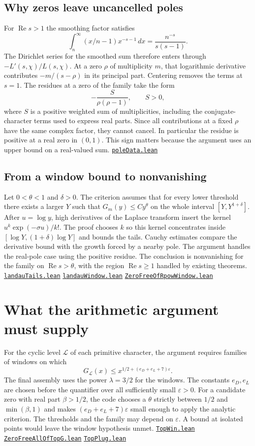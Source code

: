 \documentclass[11pt,a4paper]{article}
\newcommand{\repo}{https://github.com/LiRunGuo/riemann-lean-verification}
\newcommand{\src}[2]{\href{\repo/blob/main/lean/src/#1}{\mbox{\nolinkurl{#2}}}}
\newcommand{\cb}{Development/AutomorphicArithmetic/CharacterBoxes}
\newcommand{\lt}{Development/AutomorphicArithmetic/DedekindLFunctions/LandauTheorems}
\newcommand{\tc}{Development/AutomorphicArithmetic/ThetaCorrespondence/ThetaPairLifts/ThirdPlaceSeries}
\newcommand{\hc}{Formalism/SharpRestriction/RamificationFrobenius/TotientGaloisClasses}
\newcommand{\RePart}{\operatorname{Re}}
\begin{document}
\subsection*{Why zeros leave uncancelled poles}

For $\RePart s>1$ the smoothing factor satisfies
\[
 \int_n^\infty (x/n-1)x^{-s-1}\,dx=\frac{n^{-s}}{s(s-1)}.
\]
The Dirichlet series for the smoothed sum therefore enters through
$-L'(s,\chi)/L(s,\chi)$. At a zero $\rho$ of multiplicity $m$, that logarithmic
derivative contributes $-m/(s-\rho)$ in its principal part. Centering removes
the terms at $s=1$. The residues at a zero of the family take the form
\[
                  -\frac{S}{\rho(\rho-1)},\qquad S>0 ,
\]
where $S$ is a positive weighted sum of multiplicities, including the
conjugate-character terms used to express real parts. Since all contributions
at a fixed $\rho$ have the same complex factor, they cannot cancel. In
particular the residue is positive at a real zero in $(0,1)$. This sign
matters because the argument uses an upper bound on a real-valued sum.
\src{\lt/poleData.lean}{poleData.lean}

\subsection*{From a window bound to nonvanishing}

Let $0<\theta<1$ and $\delta>0$. The criterion assumes that for every lower
threshold there exists a larger $Y$ such that $G_m(y)\le C y^\theta$ on
the whole interval $[Y,Y^{1+\delta}]$. After $u=\log y$, high derivatives of
the Laplace transform insert the kernel $u^k\exp(-\sigma u)/k!$.
The proof chooses $k$ so this kernel concentrates inside
$[\log Y,(1+\delta)\log Y]$ and bounds the tails. Cauchy estimates compare
the derivative bound with the growth forced by a nearby pole. The argument
handles the real-pole case using the positive residue. The conclusion is
nonvanishing for the family on $\RePart s>\theta$, with the region
$\RePart s\ge1$ handled by existing theorems.
\src{\lt/landauTails.lean}{landauTails.lean}
\src{\lt/landauWindow.lean}{landauWindow.lean}
\src{\lt/ZeroFreeOfRpowWindow.lean}{ZeroFreeOfRpowWindow.lean}

\clearpage
\section{What the arithmetic argument must supply}

For the cyclic level $\mathcal L$ of each primitive character, the argument
requires families of windows on which
\[
  G_{\mathcal L}(x)
     \le x^{1/2+(e_D+e_L+7)\varepsilon}.
\]
The final assembly uses the power $\lambda=3/2$ for the windows. The constants
$e_D,e_L$ are chosen before the quantifier over all sufficiently small
$\varepsilon>0$. For a candidate zero with real part $\beta>1/2$, the code
chooses a $\theta$ strictly between $1/2$ and $\min(\beta,1)$ and makes
$(e_D+e_L+7)\varepsilon$ small enough to apply the analytic criterion.
The thresholds and the family may depend on $\varepsilon$.
A bound at isolated points would leave the window hypothesis unmet.
\src{\hc/TopWin.lean}{TopWin.lean}
\src{\cb/ZeroFreeAllOfTopG.lean}{ZeroFreeAllOfTopG.lean}
\src{\tc/TopPlug.lean}{TopPlug.lean}
\end{document}
